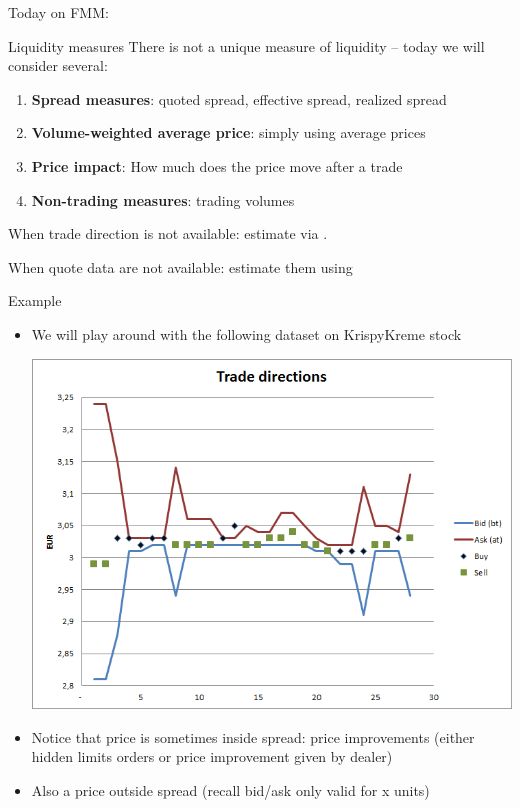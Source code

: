 \documentclass[english,10pt]{beamer}
\begin{document}
\begin{frame}{Today on FMM:}
	\tableofcontents[currentsection]
\end{frame}


\begin{frame}{Liquidity measures}
There is not a unique measure of liquidity -- today we will consider several:
\begin{enumerate}
	\item \textbf{Spread measures}: quoted spread, effective spread, realized spread
	\item \textbf{Volume-weighted average price}: simply using average prices
	\item \textbf{Price impact}: How much does the price move after a trade
	\item \textbf{Non-trading measures}: trading volumes
\end{enumerate}

When trade direction is not available: estimate via . 

When quote data are not available: estimate them using 
\end{frame}


\begin{frame}{Example}
	\begin{itemize}
		\item We will play around with the following dataset on KrispyKreme stock
		\begin{center}
			\includegraphics[scale=0.34]{pics/L2_directions}
		\end{center}
		\pause
		\item Notice that price is sometimes inside spread: price improvements (either hidden limits orders or price improvement given by dealer)
		\item Also a price outside spread (recall bid/ask only valid for x units)
	\end{itemize}
\end{frame}
\end{document}
